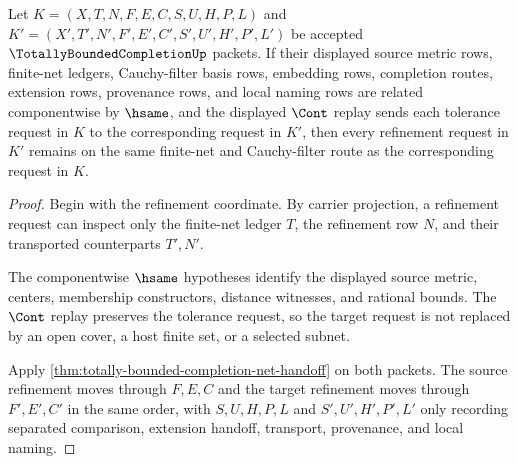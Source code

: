 \begin{theorem}
\label{thm:totally-bounded-completion-refinement-stability}
Let $K=(X,T,N,F,E,C,S,U,H,P,L)$ and $K'=(X',T',N',F',E',C',S',U',H',P',L')$ be accepted $\TotallyBoundedCompletionUp$ packets. If their displayed source metric rows, finite-net ledgers, Cauchy-filter basis rows, embedding rows, completion routes, extension rows, provenance rows, and local naming rows are related componentwise by $\hsame$, and the displayed $\Cont$ replay sends each tolerance request in $K$ to the corresponding request in $K'$, then every refinement request in $K'$ remains on the same finite-net and Cauchy-filter route as the corresponding request in $K$.
\end{theorem}
\begin{proof}
Begin with the refinement coordinate. By carrier projection, a refinement request can inspect only the finite-net ledger $T$, the refinement row $N$, and their transported counterparts $T',N'$.

The componentwise $\hsame$ hypotheses identify the displayed source metric, centers, membership constructors, distance witnesses, and rational bounds. The $\Cont$ replay preserves the tolerance request, so the target request is not replaced by an open cover, a host finite set, or a selected subnet.

Apply \autoref{thm:totally-bounded-completion-net-handoff} on both packets. The source refinement moves through $F,E,C$ and the target refinement moves through $F',E',C'$ in the same order, with $S,U,H,P,L$ and $S',U',H',P',L'$ only recording separated comparison, extension handoff, transport, provenance, and local naming.
\end{proof}

